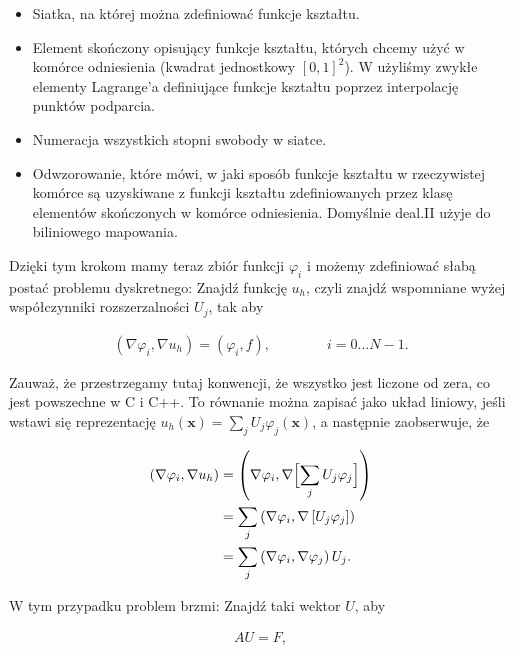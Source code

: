 \documentclass[]{pracamgr}
\begin{document}
      \begin{itemize}
        \item Siatka, na której można zdefiniować funkcje kształtu.
        \item Element skończony opisujący funkcje kształtu, których chcemy użyć w komórce odniesienia (kwadrat jednostkowy $[0,1]^2$). W użyliśmy zwykłe elementy Lagrange'a definiujące funkcje kształtu poprzez interpolację punktów podparcia.
        \item Numeracja wszystkich stopni swobody w siatce.
        \item Odwzorowanie, które mówi, w jaki sposób funkcje kształtu w rzeczywistej komórce są uzyskiwane z funkcji kształtu zdefiniowanych przez klasę elementów skończonych w komórce odniesienia. Domyślnie  deal.II użyje do biliniowego mapowania.
      \end{itemize}

      Dzięki tym krokom mamy teraz zbiór funkcji $\varphi_i$ i możemy zdefiniować słabą postać problemu dyskretnego: Znajdź funkcję $u_h$, czyli znajdź wspomniane wyżej współczynniki rozszerzalności $U_j$, tak aby

      \begin{align*}
        (\nabla\varphi_i, \nabla u_h)
         = (\varphi_i, f),
         \qquad\qquad
         i=0\ldots N-1.
      \end{align*}

      Zauważ, że przestrzegamy tutaj konwencji, że wszystko jest liczone od zera, co jest powszechne w C i C++. To równanie można zapisać jako układ liniowy, jeśli wstawi się reprezentację $u_h(\mathbf x)=\sum_j U_j \varphi_j(\mathbf x)$, a następnie zaobserwuje, że

      \begin{align*}
        (\nabla\varphi_i, \nabla u_h)
        &= \left(\nabla\varphi_i, \nabla \Bigl[\sum_j U_j \varphi_j\Bigr]\right)
        \\
        &= \sum_j \left(\nabla\varphi_i, \nabla \left[U_j \varphi_j\right]\right)
        \\
        &= \sum_j \left(\nabla\varphi_i, \nabla \varphi_j \right) U_j.
      \end{align*}

      W tym przypadku problem brzmi: Znajdź taki wektor $U$, aby
      
      \begin{align*}
        A U = F,
      \end{align*}
\end{document}
